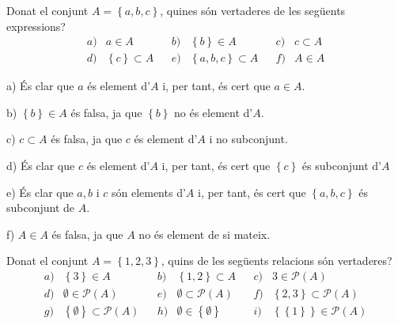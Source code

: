 \begin{exer}
Donat el conjunt $A=\left\{ a,b,c\right\} $, quines s\'{o}n vertaderes de
les seg\"{u}ents expressions?%
\begin{equation*}
\begin{array}{cccccccc}
a) & a\in A &  & b) & \left\{ b\right\} \in A &  & c) & c\subset A \\
d) & \left\{ c\right\} \subset A &  & e) & \left\{ a,b,c\right\} \subset A &
& f) & A\in A%
\end{array}%
\end{equation*}
\end{exer}

\begin{solucio}
a) \'{E}s clar que $a$ \'{e}s element d'$A$ i, per tant, \'{e}s cert que $%
a\in A$.

b) $\left\{ b\right\} \in A$ \'{e}s falsa, ja que $\left\{ b\right\} $ no
\'{e}s element d'$A$.

c) $c\subset A$ \'{e}s falsa, ja que $c$ \'{e}s element d'$A$ i no
subconjunt.

d) \'{E}s clar que $c$ \'{e}s element d'$A$ i, per tant, \'{e}s cert que $%
\left\{ c\right\} $ \'{e}s subconjunt d'$A$

e) \'{E}s clar que $a,b$ i $c$ s\'{o}n elements d'$A$ i, per tant, \'{e}s
cert que $\left\{ a,b,c\right\} $ \'{e}s subconjunt de $A$.

f) $A\in A$ \'{e}s falsa, ja que $A$ no \'{e}s element de si mateix.
\end{solucio}

\begin{exer}
Donat el conjunt $A=\left\{ 1,2,3\right\} $, quins de les seg\"{u}ents
relacions s\'{o}n vertaderes?%
\begin{equation*}
\begin{array}{llllllll}
a) & \left\{ 3\right\} \in A &  & b) & \left\{ 1,2\right\} \subset A &  & c)
& 3\in \mathcal{P}(A) \\
d) & \emptyset \in \mathcal{P}(A) &  & e) & \emptyset \subset \mathcal{P}(A)
&  & f) & \left\{ 2,3\right\} \subset \mathcal{P}(A) \\
g) & \left\{ \emptyset \right\} \subset \mathcal{P}(A) &  & h) & \emptyset
\in \left\{ \emptyset \right\} &  & i) & \left\{ \left\{ 1\right\} \right\}
\in \mathcal{P}(A)%
\end{array}%
\end{equation*}
\end{exer}

